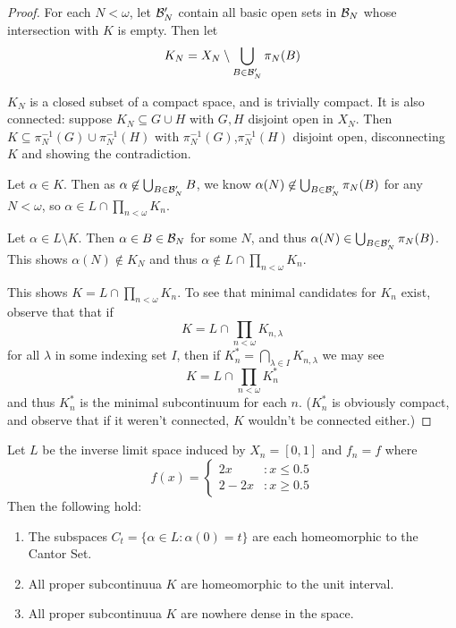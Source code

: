 \begin{proof}
  For each $N<\omega$, let $\mathcal{B}'_N$ contain all basic open sets in $\mathcal{B}_N$ whose intersection with $K$ is empty. Then let 
    \[
      K_N = X_N \setminus \bigcup_{B\in\mathcal{B}'_N} \pi_N(B)
    \]

  $K_N$ is a closed subset of a compact space, and is trivially compact. It is also connected: suppose $K_N\subseteq G\cup H$ with $G,H$ disjoint open in $X_N$. Then $K\subseteq \pi_N^{-1}(G)\cup\pi_N^{-1}(H)$ with $\pi_N^{-1}(G)$,$\pi_N^{-1}(H)$ disjoint open, disconnecting $K$ and showing the contradiction.

  Let $\alpha\in K$. Then as $\alpha\not\in \bigcup_{B\in\mathcal{B}'_N} B$, we know $\alpha(N)\not\in \bigcup_{B\in\mathcal{B}'_N} \pi_N(B)$ for any $N<\omega$, so $\alpha \in L \cap \prod_{n<\omega} K_n$.

  Let $\alpha\in L\setminus K$. Then $\alpha\in B \in \mathcal{B}_N$ for some $N$, and thus $\alpha(N)\in \bigcup_{B\in\mathcal{B}'_N} \pi_N(B)$. This shows $\alpha(N)\not\in K_N$ and thus $\alpha \not\in L \cap \prod_{n<\omega} K_n$.

  This shows $K = L \cap \prod_{n<\omega} K_n$. To see that minimal candidates for $K_n$ exist, observe that that if
    \[
      K = L \cap \prod_{n<\omega} K_{n,\lambda}
    \]
  for all $\lambda$ in some indexing set $I$, then if $K^*_n = \bigcap_{\lambda\in I} K_{n,\lambda}$ we may see
    \[
      K = L \cap \prod_{n<\omega} K^*_n
    \]
  and thus $K^*_n$ is the minimal subcontinuum for each $n$. ($K^*_n$ is obviously compact, and observe that if it weren't connected, $K$ wouldn't be connected either.)
\end{proof}

\begin{example}
Let $L$ be the inverse limit space induced by $X_n=[0,1]$ and $f_n=f$ where
\[
  f(x) = \left\{
     \begin{array}{lr}
       2x & : x \leq 0.5 \\
       2-2x & : x \geq 0.5
     \end{array}
   \right.
\]
Then the following hold:
  \begin{enumerate}
    \item The subspaces $C_t = \{\alpha\in L : \alpha(0)=t\}$ are each homeomorphic to the Cantor Set.
    \item All proper subcontinuua $K$ are homeomorphic to the unit interval.
    \item All proper subcontinuua $K$ are nowhere dense in the space.
  \end{enumerate}
\end{example}

